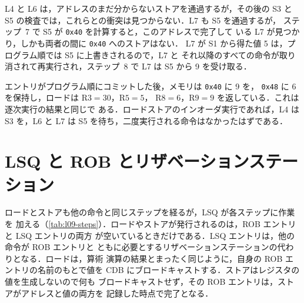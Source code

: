 \documentclass[../main.tex]{subfiles}
\begin{document}
L4 と L6 は，アドレスのまだ分からないストアを通過するが，その後の S3 と
S5 の検査では，これらとの衝突は見つからない．L7 も S5 を通過するが，
ステップ~7 で S5 が \texttt{0x40} を計算すると，このアドレスで完了して
いる L7 が見つかり，しかも両者の間に \texttt{0x40} へのストアはない．
L7 が S1 から得た値 5 は，プログラム順では S5 に上書きされるので，L7 と
それ以降のすべての命令が取り消されて再実行され，ステップ~8 で L7 は S5
から 9 を受け取る．

エントリがプログラム順にコミットした後，メモリは \texttt{0x40} に 9 を，
\texttt{0x48} に 6 を保持し，ロードは $\text{R3}=30$，$\text{R5}=5$，
$\text{R8}=6$，$\text{R9}=9$ を返している．これは逐次実行の結果と同じで
ある．ロードストアのインオーダ実行であれば，L4 は S3 を，L6 と L7 は S5
を待ち，二度実行される命令はなかったはずである．

\section{LSQ と ROB とリザベーションステーション}
\label{sec:l09-rob-rs}

ロードとストアも他の命令と同じステップを経るが，LSQ が各ステップに作業を
加える（\cref{tab:l09-steps}）．ロードやストアが発行されるのは，ROB エントリと LSQ エントリの両方
が空いているときだけである．LSQ エントリは，他の命令が ROB エントリと
ともに必要とするリザベーションステーションの代わりとなる．ロードは，算術
演算の結果とまったく同じように，自身の ROB エントリの名前のもとで値を CDB
にブロードキャストする．ストアはレジスタの値を生成しないので何も
ブロードキャストせず，その ROB エントリは，ストアがアドレスと値の両方を
記録した時点で完了となる．
\end{document}
